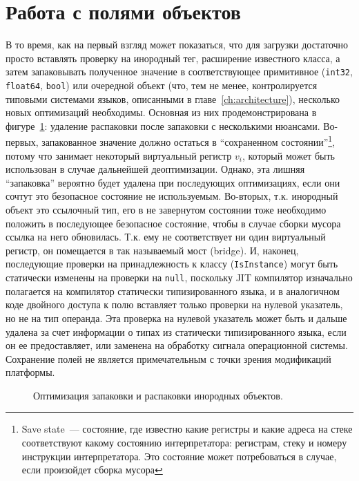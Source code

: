 \documentclass[times,specification,annotation]{itmo-student-thesis}
\begin{document}
\section{Работа с полями объектов}
В то время, как на первый взгляд может показаться, что для загрузки достаточно просто вставлять проверку на инородный тег, расширение известного класса, а затем запаковывать полученное значение в соответствующее примитивное (\texttt{int32}, \texttt{float64}, \texttt{bool}) или очередной объект (что, тем не менее, контролируется типовыми системами языков, описанными в главе~\ref{ch:architecture}), несколько новых оптимизаций необходимы. Основная из них продемонстрирована в фигуре~\ref{fig:field-opt}: удаление распаковки после запаковки с несколькими нюансами. Во-первых, запакованное значение должно остаться в ``сохраненном состоянии''\footnote{Save state~--- состояние, где известно какие регистры и какие адреса на стеке соответствуют какому состоянию интерпретатора: регистрам, стеку и номеру инструкции интерпретатора. Это состояние может потребоваться в случае, если произойдет сборка мусора}, потому что занимает некоторый виртуальный регистр $v_i$, который может быть использован в случае дальнейшей деоптимизации. Однако, эта лишняя ``запаковка'' вероятно будет удалена при последующих оптимизациях, если они сочтут это безопасное состояние не используемым. Во-вторых, т.к. инородный объект это ссылочный тип, его в не завернутом состоянии тоже необходимо положить в последующее безопасное состояние, чтобы в случае сборки мусора ссылка на него обновилась. Т.к. ему не соответствует ни один виртуальный регистр, он помещается в так называемый мост (bridge). И, наконец, последующие проверки на принадлежность к классу (\texttt{IsInstance}) могут быть статически изменены на проверки на \texttt{null}, поскольку JIT компилятор изначально полагается на компилятор статически типизированного языка, и в аналогичном коде двойного доступа к полю вставляет только проверки на нулевой указатель, но не на тип операнда. Эта проверка на нулевой указатель может быть и дальше удалена за счет информации о типах из статически типизированного языка, если он ее предоставляет, или заменена на обработку сигнала операционной системы.\\
Сохранение полей не является примечательным с точки зрения модификаций платформы.

\begin{figure}[!h]
	\caption{Оптимизация запаковки и распаковки инородных объектов.}\label{fig:field-opt}
	\centering
	\end{figure}
\end{document}
